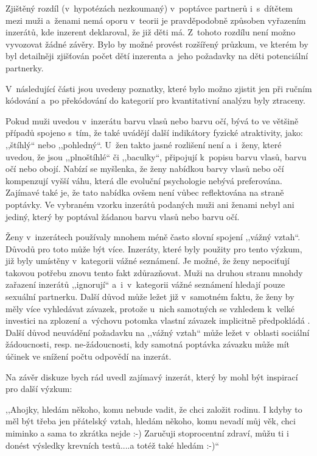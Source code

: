 \documentclass[a4paper, 12pt, notitlepage, oneside, numbers=noenddot]{report}
\begin{document}
Zjištěný rozdíl (v~hypotézách nezkoumaný) v~poptávce partnerů
i~s~dítětem mezi muži a~ženami nemá oporu v~teorii je pravděpodobně
způsoben vyřazením inzerátů, kde inzerent deklaroval, že již děti má.
Z~tohoto rozdílu není možno vyvozovat žádné závěry.  Bylo by možné
provést rozšířený průzkum, ve kterém by byl detailněji zjišťován počet
dětí inzerenta a~jeho požadavky na děti potenciální partnerky.

V~následující části jsou uvedeny poznatky, které bylo možno zjistit
jen při ručním kódování a~po překódování do kategorií pro
kvantitativní analýzu byly ztraceny.

Pokud muži uvedou v~inzerátu barvu vlasů nebo barvu očí, bývá to ve
většině případů spojeno s~tím, že také uvádějí další indikátory
fyzické atraktivity, jako: ,,štíhlý`` nebo ,,pohledný``. U~žen takto
jasné rozlišení není a~i~ženy, které uvedou, že jsou ,,plnoštíhlé``
či ,,baculky``, připojují k~popisu barvu vlasů, barvu očí nebo
obojí. Nabízí se myšlenka, že ženy nabídkou barvy vlasů nebo očí
kompenzují vyšší váhu, která dle evoluční psychologie nebývá
preferována.  Zajímavé také je, že tato nabídka ovšem není vůbec
reflektována na straně poptávky.  Ve vybraném vzorku inzerátů podaných
muži ani ženami nebyl ani jediný, který by poptával žádanou barvu
vlasů nebo barvu očí.

Ženy v~inzerátech používaly mnohem méně často slovní spojení ,,vážný
vztah``.  Důvodů pro toto může být více.  Inzeráty, které byly použity
pro tento výzkum, již byly umístěny v~kategorii vážné seznámení.  Je
možné, že ženy nepociťují takovou potřebu znovu tento fakt
zdůrazňovat.  Muži na druhou stranu mnohdy zařazení inzerátů
,,ignorují`` a~i~v~ka\-te\-gorii vážné seznámení hledají pouze sexuální
partnerku.  Další důvod může ležet již v~samotném faktu, že ženy by
měly více vyhledávat závazek, protože u~nich samotných se vzhledem
k~velké investici na zplození a~výchovu potomka vlastní závazek
implicitně předpokládá \citep{Trivers1972}.  Další důvod neuvádění
požadavku na ,,vážný vztah`` může ležet v~oblasti sociální
žádoucnosti, resp. ne-žádoucnosti, kdy samotná poptávka závazku může
mít účinek ve snížení počtu odpovědí na inzerát.

Na závěr diskuze bych rád uvedl zajímavý inzerát, který by mohl být
inspirací pro další výzkum:

,,Ahojky, hledám někoho, komu nebude vadit, že chci založit rodinu. I
kdyby to měl být třeba jen přátelský vztah, hledám někoho, komu nevadí
můj věk, chci miminko a sama to zkrátka nejde :-) Zaručuji
stoprocentní zdraví, můžu ti i donést výsledky krevních testů....a
totéž také hledám :-)``
\end{document}
